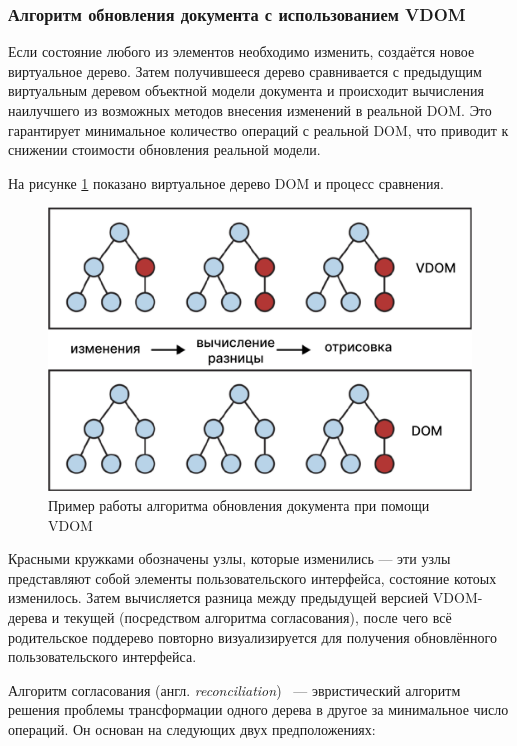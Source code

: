\subsubsection{Алгоритм обновления документа с использованием VDOM}

Если состояние любого из элементов необходимо изменить, создаётся новое виртуальное дерево.
Затем получившееся дерево сравнивается с предыдущим виртуальным деревом объектной модели документа и происходит вычисления наилучшего из возможных методов внесения изменений в реальной DOM. 
Это гарантирует минимальное количество операций с реальной DOM, что приводит к снижении стоимости обновления реальной модели. 

На рисунке \ref{fig:vdom-example} показано виртуальное дерево DOM и процесс сравнения.

\begin{figure}[h]
	\centering
	\captionsetup{justification=centering}
	\includegraphics[width=130mm]{img/vdom-example.png}
	\caption{Пример работы алгоритма обновления документа при помощи VDOM}
	\label{fig:vdom-example}
\end{figure}

Красными кружками обозначены узлы, которые изменились --- эти узлы представляют собой элементы пользовательского интерфейса, состояние котоых изменилось.
Затем вычисляется разница между предыдущей версией VDOM-дерева и текущей (посредством алгоритма согласования), после чего всё родительское поддерево повторно визуализируется для получения обновлённого пользовательского интерфейса.


Алгоритм согласования (англ. \textit{reconciliation})~\cite{reconciliation} --- эвристический алгоритм решения проблемы трансформации одного дерева в другое за минимальное число операций.
Он основан на следующих двух предположениях:

